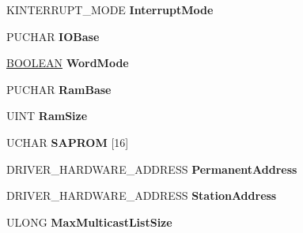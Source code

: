 \begin{DoxyCompactItemize}
\item 
\mbox{\label{struct___n_i_c___a_d_a_p_t_e_r_ac419e3399552b7c04f93f5489d60c8cb}} 
K\+I\+N\+T\+E\+R\+R\+U\+P\+T\+\_\+\+M\+O\+DE {\bfseries Interrupt\+Mode}
\item 
\mbox{\label{struct___n_i_c___a_d_a_p_t_e_r_a4d0b19119c1e00319f0bcc43d4579106}} 
P\+U\+C\+H\+AR {\bfseries I\+O\+Base}
\item 
\mbox{\label{struct___n_i_c___a_d_a_p_t_e_r_a4a04d9e710b37c4521c1cf32dc6294f3}} 
\hyperlink{_processor_bind_8h_a112e3146cb38b6ee95e64d85842e380a}{B\+O\+O\+L\+E\+AN} {\bfseries Word\+Mode}
\item 
\mbox{\label{struct___n_i_c___a_d_a_p_t_e_r_aa0b8dc5dc29e417871305e9fca21e32e}} 
P\+U\+C\+H\+AR {\bfseries Ram\+Base}
\item 
\mbox{\label{struct___n_i_c___a_d_a_p_t_e_r_a44550a28994849bcfff10ed25e937233}} 
U\+I\+NT {\bfseries Ram\+Size}
\item 
\mbox{\label{struct___n_i_c___a_d_a_p_t_e_r_aaaa51cb513812b5e86a436a73a85aa37}} 
U\+C\+H\+AR {\bfseries S\+A\+P\+R\+OM} \mbox{[}16\mbox{]}
\item 
\mbox{\label{struct___n_i_c___a_d_a_p_t_e_r_ab76a28feca582dd17c824f450b1d34d1}} 
D\+R\+I\+V\+E\+R\+\_\+\+H\+A\+R\+D\+W\+A\+R\+E\+\_\+\+A\+D\+D\+R\+E\+SS {\bfseries Permanent\+Address}
\item 
\mbox{\label{struct___n_i_c___a_d_a_p_t_e_r_af8c1f027c3ff2c9c0212931f753e06e3}} 
D\+R\+I\+V\+E\+R\+\_\+\+H\+A\+R\+D\+W\+A\+R\+E\+\_\+\+A\+D\+D\+R\+E\+SS {\bfseries Station\+Address}
\item 
\mbox{\label{struct___n_i_c___a_d_a_p_t_e_r_af1fdaaeaf0649ff301051e821c1ebf94}} 
U\+L\+O\+NG {\bfseries Max\+Multicast\+List\+Size}
\item 
\mbox{\label{struct___n_i_c___a_d_a_p_t_e_r_a7f404d0258d98ddb99477b5b9e242068}} 

\end{DoxyCompactItemize}
